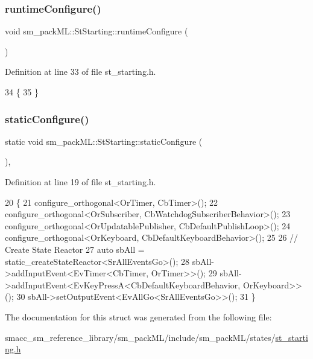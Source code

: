\subsubsection{\texorpdfstring{runtime\+Configure()}{runtimeConfigure()}}
{\footnotesize\ttfamily void sm\+\_\+pack\+M\+L\+::\+St\+Starting\+::runtime\+Configure (\begin{DoxyParamCaption}{ }\end{DoxyParamCaption})\hspace{0.3cm}{\ttfamily [inline]}}



Definition at line 33 of file st\+\_\+starting.\+h.


\begin{DoxyCode}
34     \{
35     \}
\end{DoxyCode}
\mbox{\label{structsm__packML_1_1StStarting_a027b510edb3a7fc5bc344ad9b7917f79}} 
\subsubsection{\texorpdfstring{static\+Configure()}{staticConfigure()}}
{\footnotesize\ttfamily static void sm\+\_\+pack\+M\+L\+::\+St\+Starting\+::static\+Configure (\begin{DoxyParamCaption}{ }\end{DoxyParamCaption})\hspace{0.3cm}{\ttfamily [inline]}, {\ttfamily [static]}}



Definition at line 19 of file st\+\_\+starting.\+h.


\begin{DoxyCode}
20     \{
21         configure\_orthogonal<OrTimer, CbTimer>();
22         configure\_orthogonal<OrSubscriber, CbWatchdogSubscriberBehavior>();
23         configure\_orthogonal<OrUpdatablePublisher, CbDefaultPublishLoop>();
24         configure\_orthogonal<OrKeyboard, CbDefaultKeyboardBehavior>();
25 
26         \textcolor{comment}{// Create State Reactor}
27         \textcolor{keyword}{auto} sbAll = static\_createStateReactor<SrAllEventsGo>();
28         sbAll->addInputEvent<EvTimer<CbTimer, OrTimer>>();
29         sbAll->addInputEvent<EvKeyPressA<CbDefaultKeyboardBehavior, OrKeyboard>>();
30         sbAll->setOutputEvent<EvAllGo<SrAllEventsGo>>();
31     \}
\end{DoxyCode}


The documentation for this struct was generated from the following file\+:\begin{DoxyCompactItemize}
\item 
smacc\+\_\+sm\+\_\+reference\+\_\+library/sm\+\_\+pack\+M\+L/include/sm\+\_\+pack\+M\+L/states/\hyperlink{st__starting_8h}{st\+\_\+starting.\+h}\end{DoxyCompactItemize}

